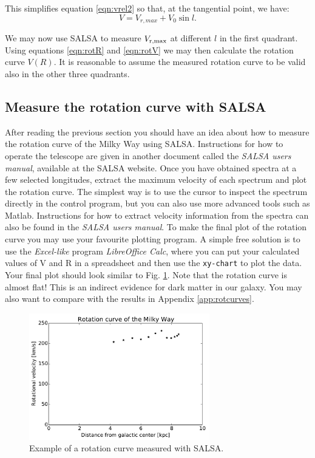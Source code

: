 This simplifies equation \ref{eqn:vrel2} so that, at the tangential point, we
have: 
\begin{equation}
V = V_{r,max} + V_0 \sin l .
\label{eqn:rotV}
\end{equation}

We may now use SALSA to measure $V_{\rm r,max}$ at different $l$ in the first
quadrant.  Using equations \ref{eqn:rotR} and \ref{eqn:rotV} we may then
calculate the rotation curve $V(R)$. It is reasonable to assume the measured
rotation curve to be valid also in the other three quadrants.

\subsection{Measure the rotation curve with SALSA}
\label{sect:SALSArot}
After reading the previous section you should have an idea about how to measure
the rotation curve of the Milky Way using SALSA. Instructions for how to
operate the telescope are given in another document called the \emph{SALSA
users manual}, available at the SALSA website.
Once you have obtained spectra
at a few selected longitudes, extract the maximum velocity of each spectrum and
plot the rotation curve.   
The simplest way is to use the cursor to inspect the spectrum directly in the
control program, but you can also use more advanced tools such as
Matlab. Instructions for how to extract velocity information from the spectra
can also be found in the \emph{SALSA users manual}.
To make the final plot of the rotation curve you may use your favourite
plotting program.  A simple free solution is to use the \emph{Excel-like}
program \emph{LibreOffice Calc}, where you can put your calculated
values of V and R in a spreadsheet and then use the {\tt xy-chart} 
to plot the data. Your final plot should look similar to Fig. \ref{fig:rotfinal}.
Note that the rotation curve is almost flat! This is an indirect evidence
for dark matter in our galaxy. You may also want to compare with the results in 
Appendix \ref{app:rotcurves}.

\begin{figure}[t]
\begin{center}
\includegraphics[width=0.7\textwidth]{../figures/SALSA_rotcurve.pdf}
\caption{Example of a rotation curve measured with SALSA.}
\label{fig:rotfinal}
\end{center}
\end{figure}

